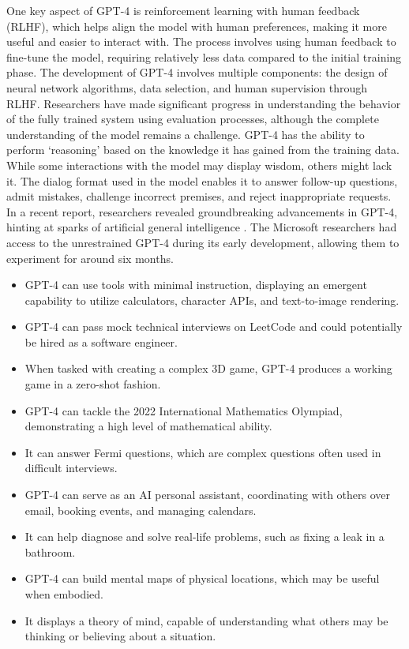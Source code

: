 One key aspect of GPT-4 is reinforcement learning with human feedback (RLHF), which helps align the model with human preferences, making it more useful and easier to interact with. The process involves using human feedback to fine-tune the model, requiring relatively less data compared to the initial training phase. The development of GPT-4 involves multiple components: the design of neural network algorithms, data selection, and human supervision through RLHF. Researchers have made significant progress in understanding the behavior of the fully trained system using evaluation processes, although the complete understanding of the model remains a challenge. GPT-4 has the ability to perform `reasoning' based on the knowledge it has gained from the training data. While some interactions with the model may display wisdom, others might lack it. The dialog format used in the model enables it to answer follow-up questions, admit mistakes, challenge incorrect premises, and reject inappropriate requests. In a recent report, researchers revealed groundbreaking advancements in GPT-4, hinting at sparks of artificial general intelligence \cite{bubeck2023sparks}. The Microsoft researchers had access to the unrestrained GPT-4 during its early development, allowing them to experiment for around six months. 
\begin{itemize}
\item GPT-4 can use tools with minimal instruction, displaying an emergent capability to utilize calculators, character APIs, and text-to-image rendering.
\item  GPT-4 can pass mock technical interviews on LeetCode and could potentially be hired as a software engineer.
\item When tasked with creating a complex 3D game, GPT-4 produces a working game in a zero-shot fashion.
\item GPT-4 can tackle the 2022 International Mathematics Olympiad, demonstrating a high level of mathematical ability.
\item It can answer Fermi questions, which are complex questions often used in difficult interviews.
\item GPT-4 can serve as an AI personal assistant, coordinating with others over email, booking events, and managing calendars.
\item It can help diagnose and solve real-life problems, such as fixing a leak in a bathroom.
\item GPT-4 can build mental maps of physical locations, which may be useful when embodied.
\item It displays a theory of mind, capable of understanding what others may be thinking or believing about a situation.
\end{itemize}
